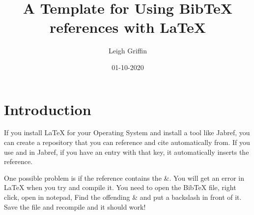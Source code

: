 \documentclass[12pt]{article}
\begin{document}
\title{A Template for Using BibTeX references with LaTeX}
\author{Leigh Griffin}
\date{01-10-2020}

\maketitle

\section{Introduction}
If you install LaTeX for your Operating System and install a tool like Jabref, you can create a repository that you can reference and cite automatically from.
If you use \cite{Sanjay2013} and in Jabref, if you have an entry with that key, it automatically inserts the reference.

One possible problem is if the reference contains the \&. You will get an error in LaTeX when you try and compile it.
You need to open the BibTeX file, right click, open in notepad,
Find the offending \& and put a backslash in front of it. Save the file and recompile and it should work!










\end{document}
